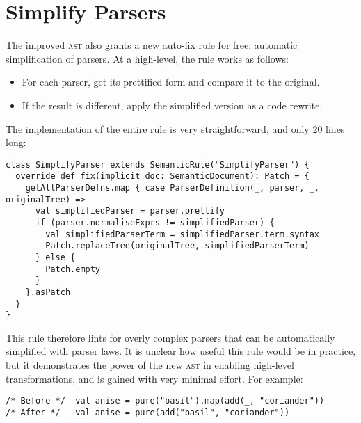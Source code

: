 \documentclass[../../main.tex]{subfiles}
\begin{document}
\section{Simplify Parsers}\label{sec:simplify-parsers-rule}
The improved  \textsc{ast} also grants a new auto-fix rule for free: automatic simplification of parsers.
At a high-level, the rule works as follows:
\begin{itemize}
  \item For each parser, get its prettified form and compare it to the original.
  \item If the result is different, apply the simplified version as a code rewrite.
\end{itemize}
%
The implementation of the entire rule is very straightforward, and only 20 lines long:
\begin{verbatim}
class SimplifyParser extends SemanticRule("SimplifyParser") {
  override def fix(implicit doc: SemanticDocument): Patch = {
    getAllParserDefns.map { case ParserDefinition(_, parser, _, originalTree) =>
      val simplifiedParser = parser.prettify
      if (parser.normaliseExprs != simplifiedParser) {
        val simplifiedParserTerm = simplifiedParser.term.syntax
        Patch.replaceTree(originalTree, simplifiedParserTerm)
      } else {
        Patch.empty
      }
    }.asPatch
  }
}
\end{verbatim}
%
This rule therefore lints for overly complex parsers that can be automatically simplified with parser laws.
It is unclear how useful this rule would be in practice, but it demonstrates the power of the new  \textsc{ast} in enabling high-level transformations, and is gained with very minimal effort.
For example:
\begin{verbatim}
/* Before */  val anise = pure("basil").map(add(_, "coriander"))
/* After */   val anise = pure(add("basil", "coriander"))
\end{verbatim}
\end{document}
